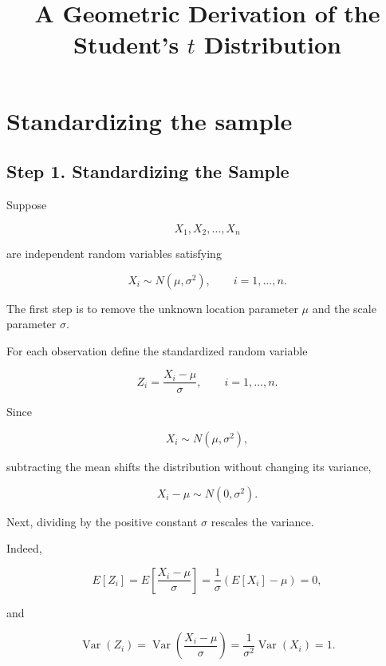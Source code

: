 \documentclass[11pt]{article}
\title{A Geometric Derivation of the Student's $t$ Distribution}
\author{}
\date{}
\begin{document}
	
	\maketitle
	\tableofcontents
	
	\section{Standardizing the sample}
	\begin{mdframed}[
		linewidth=0.8pt,
		roundcorner=6pt,
		backgroundcolor=gray!5,
		linecolor=gray!60,
		innertopmargin=10pt,
		innerbottommargin=10pt,
		innerleftmargin=10pt,
		innerrightmargin=10pt
		]
		
		\subsection*{Step 1. Standardizing the Sample}
		
		Suppose
		
		\[
		X_1,X_2,\ldots,X_n
		\]
		
		are independent random variables satisfying
		
		\[
		X_i\sim N(\mu,\sigma^2),
		\qquad
		i=1,\ldots,n.
		\]
		
		The first step is to remove the unknown location parameter $\mu$ and the
		scale parameter $\sigma$.
		
		For each observation define the standardized random variable
		
		\[
		\boxed{
			Z_i
			=
			\frac{X_i-\mu}{\sigma},
			\qquad
			i=1,\ldots,n.
		}
		\]
		
		Since
		
		\[
		X_i\sim N(\mu,\sigma^2),
		\]
		
		subtracting the mean shifts the distribution without changing its
		variance,
		
		\[
		X_i-\mu
		\sim
		N(0,\sigma^2).
		\]
		
		Next, dividing by the positive constant $\sigma$ rescales the variance.
		
		Indeed,
		
		\[
		E[Z_i]
		=
		E\!\left[
		\frac{X_i-\mu}{\sigma}
		\right]
		=
		\frac{1}{\sigma}
		\left(
		E[X_i]-\mu
		\right)
		=
		0,
		\]
		
		and
		
		\[
		\operatorname{Var}(Z_i)
		=
		\operatorname{Var}
		\left(
		\frac{X_i-\mu}{\sigma}
		\right)
		=
		\frac1{\sigma^2}
		\operatorname{Var}(X_i)
		=
		1.
		\]
		

\end{mdframed}
\end{document}
